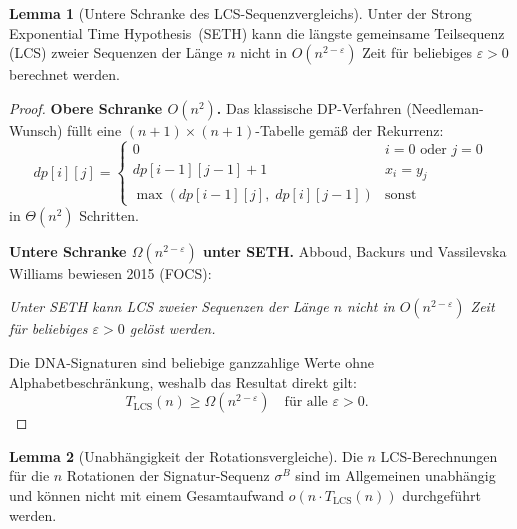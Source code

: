 ﻿\documentclass[a4paper,12pt]{article}
\theoremstyle{definition}
\newtheorem{lemma}{Lemma}
\begin{document}
\begin{lemma}[Untere Schranke des LCS-Sequenzvergleichs]
    \label{lem:lcs}
    Unter der Strong Exponential Time Hypothesis~(SETH) kann die längste gemeinsame
    Teilsequenz (LCS) zweier Sequenzen der Länge $n$ nicht in $O(n^{2-\varepsilon})$
    Zeit für beliebiges $\varepsilon > 0$ berechnet werden.
\end{lemma}

\begin{proof}
    \textbf{Obere Schranke $O(n^2)$.}
    Das klassische DP-Verfahren (Needleman-Wunsch) füllt eine
    $(n+1) \times (n+1)$-Tabelle gemäß der Rekurrenz:
    \[
        dp[i][j] = \begin{cases}
            0 & i = 0 \text{ oder } j = 0 \\
            dp[i-1][j-1] + 1 & x_i = y_j \\
            \max(dp[i-1][j],\; dp[i][j-1]) & \text{sonst}
        \end{cases}
    \]
    in $\Theta(n^2)$ Schritten.

    \textbf{Untere Schranke $\Omega(n^{2-\varepsilon})$ unter SETH.}
    Abboud, Backurs und Vassilevska Williams bewiesen 2015 (FOCS):
    \medskip

    \emph{Unter SETH kann LCS zweier Sequenzen der Länge $n$ nicht in
    $O(n^{2-\varepsilon})$ Zeit für beliebiges $\varepsilon > 0$ gelöst werden.}
    \medskip

    Die DNA-Signaturen sind beliebige ganzzahlige Werte ohne Alphabetbeschränkung,
    weshalb das Resultat direkt gilt:
    \[
        T_{\mathrm{LCS}}(n) \geq \Omega(n^{2-\varepsilon})
        \quad \text{für alle } \varepsilon > 0. \qquad 
    \]
\end{proof}

\begin{lemma}[Unabhängigkeit der Rotationsvergleiche]
    \label{lem:unabhaengigkeit}
    Die $n$ LCS-Berechnungen für die $n$ Rotationen der Signatur-Sequenz
    $\sigma^B$ sind im Allgemeinen unabhängig und können nicht mit einem
    Gesamtaufwand $o(n \cdot T_{\mathrm{LCS}}(n))$ durchgeführt werden.
\end{lemma}
\end{document}
